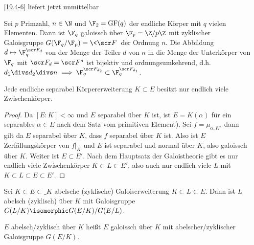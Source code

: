 \ref{19.4-6} liefert jetzt unmittelbar

\begin{st} \label{19.5-2}
	Sei $p$ Primzahl, $n \in \N$ und $\F_2 = \GF(q)$ der endliche Körper mit $q$ vielen Elementen.
	Dann ist $\F_q$ galoissch über $\F_p = \Z / p\Z$ mit zyklischer Galoisgruppe $G(\F_q / \F_p) = \<\scr F\>$ der Ordnung $n$.
	Die Abbildung $d \mapsto \F_q^{\scr F_d}$ von der Menge der Teiler $d$ von $n$ in die Menge der Unterkörper von $\F_q$ mit $\scr F_d = \scr F^d$ ist bijektiv und ordnungsumkehrend, d.h. $d_1 \divs d_2 \divs n \implies \F_q^{\scr F_{d_2}} \subset \F_q^{\scr F_{d_1}}$.
\end{st}

\begin{st} \label{19.5-3}
	Jede endliche separabel Körpererweiterung $K \subset E$ besitzt nur endlich viele Zwischenkörper.
	\begin{proof}
		Da $[E : K] < \infty$ und $E$ separabel über $K$ ist, ist $E = K(\alpha)$ für ein separables $\alpha \in E$ nach dem Satz vom primitiven Element).
		Sei $f = \mu_{\alpha, K}$, dann gilt da $E$ separabel über $K$, dass $f$ separabel über $K$ ist.
		Also ist $E$ Zerfällungskörper von $f|_K$ und $E$ ist separabel und normal über $K$, also galoissch über $K$.
		Weiter ist $E \subset E'$.
		Nach dem Hauptsatz der Galoistheorie gibt es nur endlich viele Zwischenkörper $K \subset L \subset E'$, also auch nur endlich viele $L$ mit $K \subset L \subset E \subset E'$.
	\end{proof}
\end{st}

\begin{st} \label{19.5-4}
	Sei $K \subset E \subset \_K$ abelsche (zyklische) Galoiserweiterung $K \subset L \subset E$.
	Dann ist $L$ abelsch (zyklisch) über $K$ mit Galoisgruppe $G(L/K) \isomorphic G(E/K) / G(E/L)$.
\end{st}

\begin{note}
	$E$ abelsch/zyklisch über $K$ heißt $E$ galoissch über $K$ mit abelscher/zyklischer Galoisgruppe $G(E/K)$.
\end{note}


